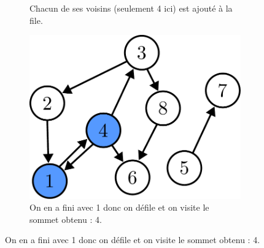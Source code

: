 \documentclass{article}
\begin{document}
\begin{itemize}
\begin{figure}[b]
\begin{subfigure}[t]{0.3\linewidth}
			\caption{Chacun de ses voisins (seulement 4 ici) est ajouté à la file.}
		\end{subfigure}\hfill%
		\begin{subfigure}[t]{0.3\linewidth}
			\centering
			\includegraphics[width=0.9\linewidth]{../figures/bfs3.pdf}
			\caption{On en a fini avec 1 donc on défile et on visite le sommet obtenu : 4.}
		\end{subfigure}
	

\end{figure}
\end{itemize}
\end{document}
